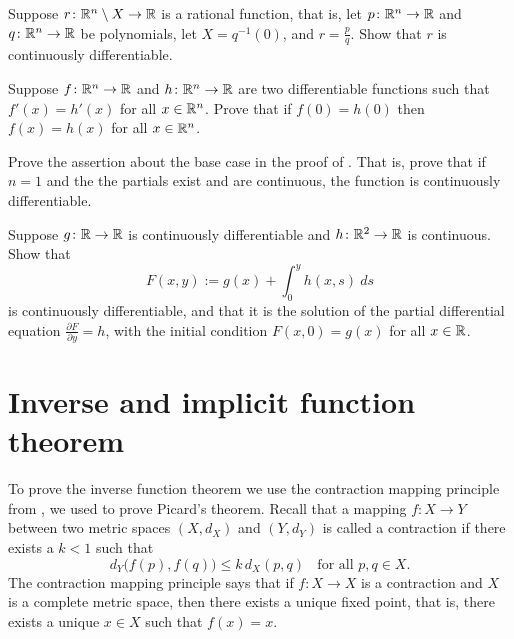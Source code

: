 \begin{exercise}
Suppose $r \colon {\mathbb{R}}^n \setminus X \to {\mathbb{R}}$ is a rational function, that is,
let $p \colon {\mathbb{R}}^n \to {\mathbb{R}}$ and
$q \colon {\mathbb{R}}^n \to {\mathbb{R}}$ be polynomials, let $X = q^{-1}(0)$, and
$r = \frac{p}{q}$.
Show that $r$ is continuously differentiable.
\end{exercise}

\begin{exercise}
Suppose $f \colon {\mathbb{R}}^n \to {\mathbb{R}}$ and $h \colon {\mathbb{R}}^n \to {\mathbb{R}}$ are two 
differentiable functions such that $f'(x) = h'(x)$ for all $x \in {\mathbb{R}}^n$.
Prove that
if $f(0) = h(0)$ then $f(x) = h(x)$ for all $x \in {\mathbb{R}}^n$.
\end{exercise}

\begin{exercise}
Prove the assertion about the base case
in the proof of .  That is, prove that
if $n=1$ and the
the partials exist and are continuous, the function is continuously
differentiable.
\end{exercise}

\begin{exercise}
Suppose $g \colon {\mathbb{R}} \to {\mathbb{R}}$ is continuously differentiable and
$h \colon {\mathbb{R}}^2 \to {\mathbb{R}}$ is continuous.  Show that
\begin{equation*}
F(x,y) := g(x) + \int_0^y h(x,s) ~ds
\end{equation*}
is continuously differentiable, and that it is the solution of 
the partial differential equation $\frac{\partial F}{\partial y} = h$,
with the initial condition $F(x,0) = g(x)$ for all $x \in {\mathbb{R}}$.
\end{exercise}



\sectionnewpage
\section{Inverse and implicit function theorem}
\label{sec:svinvfuncthm}


To prove the inverse function theorem we use the contraction mapping
principle from ,
we used
to prove Picard's theorem.
Recall that a mapping $f \colon X \to Y$ between two metric
spaces $(X,d_X)$ and $(Y,d_Y)$ is called a contraction 
if there exists a $k < 1$ such that
\begin{equation*}
d_Y\bigl(f(p),f(q)\bigr) \leq k \, d_X(p,q)
\ \ \ \ \text{for all } p,q \in X.
\end{equation*}
The contraction mapping principle says that if $f \colon X \to X$
is a contraction and $X$ is a complete metric space,
then there exists a unique fixed point, that is,
there exists a unique $x \in X$ such that $f(x) = x$.

